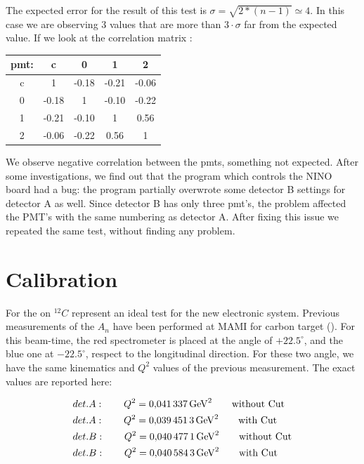 The expected error for the result of this test is $\sigma = \sqrt{2*(n-1)} \simeq 4$. In this case we are observing 3 values that are more than  $3 \cdot \sigma$ far from the expected value. If we look at the correlation matrix :

\begin{center}
\begin{tabular}{|c|c|c|c|c|}
\hline 
pmt: & c & 0 & 1 & 2 \\ 
\hline 
c 	 & 1 & -0.18  & -0.21  & -0.06  \\ 
\hline 
0 	 & -0.18  & 1 & -0.10  & -0.22  \\ 
\hline 
1    & -0.21  & -0.10  & 1 & 0.56  \\ 
\hline 
2    & -0.06 & -0.22  & 0.56  & 1 \\ 
\hline 
\end{tabular} 
\end{center}


We observe negative correlation between the pmts, something not expected. After some investigations, we find out that the program which controls the NINO board had a bug: the program partially overwrote some detector B settings for detector A as well. Since detector B has only three pmt's, the problem affected the PMT's with the same numbering as detector A. After fixing this issue we repeated the same test, without finding any problem. 

\section{Calibration}

For the \transv on $^{12}C$ represent an ideal test for the new electronic system. Previous measurements of the $A_{n}$ have been performed at MAMI for carbon target (\cite{}). For this beam-time, the red spectrometer is placed at the angle of $+22.5^{\circ}$, and the blue one at $-22.5^{\circ}$, respect to the longitudinal direction. For these two angle, we have the same kinematics and $Q^{2}$ values of the previous measurement. The exact values are reported here: 

\begin{flushleft}
\begin{align*}
& det. A : \qquad Q^{2} = \SI{0.041337}{\giga \electronvolt \squared} \qquad \textnormal{without Cut} \\
& det. A : \qquad Q^{2} = \SI{0.0394513}{\giga \electronvolt \squared} \qquad \textnormal{with Cut} \\
& det. B : \qquad Q^{2} = \SI{0.0404771}{\giga \electronvolt \squared} \qquad \textnormal{without Cut} \\
& det. B : \qquad Q^{2} = \SI{0.0405843}{\giga \electronvolt \squared} \qquad \textnormal{with Cut} 
\end{align*} 
\end{flushleft}

